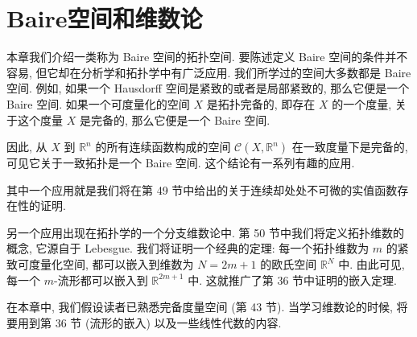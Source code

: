 ﻿\chapter{Baire空间和维数论}
\label{chapter:ch08}

本章我们介绍一类称为 Baire 空间的拓扑空间. 要陈述定义 Baire 空间的条件并不容易, 但它却在分析学和拓扑学中有广泛应用. 我们所学过的空间大多数都是 Baire 空间. 例如, 如果一个 Hausdorff 空间是紧致的或者是局部紧致的, 那么它便是一个 Baire 空间. 如果一个可度量化的空间 $X$ 是拓扑完备的, 即存在 $X$ 的一个度量, 关于这个度量 $X$ 是完备的, 那么它便是一个 Baire 空间.

因此, 从 $X$ 到 $\mathbb{R}^{n}$ 的所有连续函数构成的空间 $\mathcal{C}(X,\mathbb{R}^{n})$ 在一致度量下是完备的, 可见它关于一致拓扑是一个 Baire 空间. 这个结论有一系列有趣的应用.

其中一个应用就是我们将在第 49 节中给出的关于连续却处处不可微的实值函数存在性的证明.

另一个应用出现在拓扑学的一个分支维数论中. 第 50 节中我们将定义拓扑维数的概念, 它源自于 Lebesgue. 我们将证明一个经典的定理: 每一个拓扑维数为 $m$ 的紧致可度量化空间, 都可以嵌入到维数为 $N=2m+1$ 的欧氏空间 $\mathbb{R}^{N}$ 中. 由此可见, 每一个 $m$-流形都可以嵌入到 $\mathbb{R}^{2m+1}$ 中. 这就推广了第 36 节中证明的嵌入定理.

在本章中, 我们假设读者已熟悉完备度量空间 (第 43 节). 当学习维数论的时候, 将要用到第 36 节 (流形的嵌入) 以及一些线性代数的内容.





